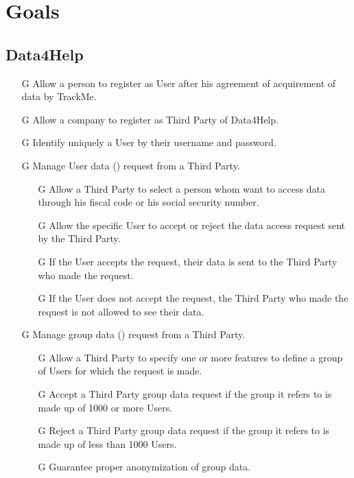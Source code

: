 \documentclass[../../rasd.tex]{subfiles}
\begin{document}
\section{Goals}
				\subsection{Data4Help}
					\begin{itemize}
						\item[G\subs{1}]Allow a person to register as User after his agreement of acquirement of data by TrackMe.
						\item[G\subs{2}]Allow a company to register as Third Party of Data4Help.
						\item[G\subs{3}]Identify uniquely a User by their username and password.

						\item[G\subs{4}]Manage User data () request from a Third Party.
							\begin{itemize}
								\item [G\subs{4.1}]Allow a Third Party to select a person whom want to access data through his fiscal code or his social security number.
								\item [G\subs{4.2}]Allow the specific User to accept or reject the data access request sent by the Third Party.
								\item [G\subs{4.3}]If the User accepts the request, their data is sent to the Third Party who made the request.
								\item [G\subs{4.4}]If the User does not accept the request, the Third Party who made the request is not allowed to see their data.
							\end{itemize}	
						\item [G\subs{5}]Manage group data () request from a Third Party.
							\begin{itemize}
								\item [G\subs{5.1}]Allow a Third Party to specify one or more features to define a group of Users for which the request is made.
								\item [G\subs{5.2}]Accept a Third Party group data request if the group it refers to is made up of 1000 or more Users.
								\item [G\subs{5.3}]Reject a Third Party group data request if the group it refers to is made up of less than 1000 Users.
								\item [G\subs{5.4}]Guarantee proper anonymization of group data.


\end{itemize}
\end{itemize}
\end{document}
